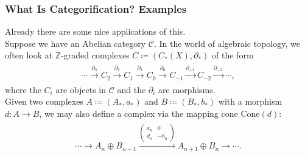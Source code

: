 \documentclass{beamer}
\begin{document}
\begin{frame}
\frametitle{What Is Categorification? Examples}
Already there are some nice applications of this.\\[2ex]
Suppose we have an Abelian category $\mathcal{C}$. In the world of algebraic topology, we often look at $\mathbb{Z}$-graded complexes $C \coloneqq (C_*(X), \partial_*)$ of the form
\begin{align*}
\begin{split}
\cdots \stackrel{\partial_{3}}{\to} C_2 \stackrel{\partial_{2}}{\to} C_1 \stackrel{\partial_{1}}{\to} C_0 \stackrel{\partial_{0}}{\to} C_{-1} \stackrel{\partial_{-1}}{\to} C_{-2} \stackrel{\partial_{-2}}{\to} \cdots,
\end{split}
\end{align*}
where the $C_i$ are objects in $\mathcal{C}$ and the $\partial_i$ are morphisms.\\[2ex]
Given two complexes $A \coloneqq (A_*, a_*)$ and $B \coloneqq (B_*, b_*)$ with a morphism $d : A \to B$, we may also define a complex via the mapping cone $\mathrm{Cone}(d)$:
\begin{align*}
\begin{split}
\cdots \to A_n \oplus B_{n-1} \xrightarrow{\begin{pmatrix}a_n&0\\d_n&-b_n\end{pmatrix}} A_{n+1} \oplus B_n \to \cdots.
\end{split}
\end{align*}
\end{frame}
\end{document}
